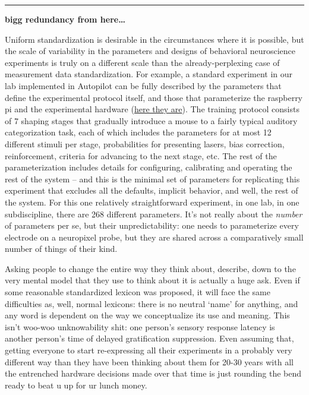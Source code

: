 \documentclass{article}
\begin{document}
\begin{center}\rule{0.5\linewidth}{0.5pt}\end{center}

\textbf{bigg redundancy from here\ldots{}}

Uniform standardization is desirable in the circumstances where it is
possible, but the scale of variability in the parameters and designs of
behavioral neuroscience experiments is truly on a different scale than
the already-perplexing case of measurement data standardization. For
example, a standard experiment in our lab implemented in Autopilot can
be fully described by the parameters that define the experimental
protocol itself, and those that parameterize the raspberry pi and the
experimental hardware
(\href{https://gist.github.com/sneakers-the-rat/eebe675326a157df49f66f62c4e33a6e}{here
they are}). The training protocol consists of 7 shaping stages that
gradually introduce a mouse to a fairly typical auditory categorization
task, each of which includes the parameters for at most 12 different
stimuli per stage, probabilities for presenting lasers, bias correction,
reinforcement, criteria for advancing to the next stage, etc. The rest
of the parameterization includes details for configuring, calibrating
and operating the rest of the system -- and this is the minimal set of
parameters for replicating this experiment that excludes all the
defaults, implicit behavior, and well, the rest of the system. For this
one relatively straightforward experiment, in one lab, in one
subdiscipline, there are 268 different parameters. It's not really about
the \emph{number} of parameters per se, but their unpredictability: one
needs to parameterize every electrode on a neuropixel probe, but they
are shared across a comparatively small number of things of their kind.

Asking people to change the entire way they think about, describe, down
to the very mental model that they use to think about it is actually a
huge ask. Even if some reasonable standardized lexicon was proposed, it
will face the same difficulties as, well, normal lexicons: there is no
neutral `name' for anything, and any word is dependent on the way we
conceptualize its use and meaning. This isn't woo-woo unknowability
shit: one person's sensory response latency is another person's time of
delayed gratification suppression. Even assuming that, getting everyone
to start re-expressing all their experiments in a probably very
different way than they have been thinking about them for 20-30 years
with all the entrenched hardware decisions made over that time is just
rounding the bend ready to beat u up for ur lunch money.
\end{document}
